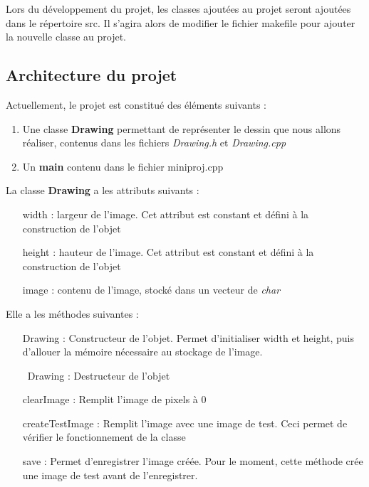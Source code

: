 \documentclass[
	12pt, %
]{fphw}
\begin{document}
Lors du développement du projet, les classes ajoutées au projet seront ajoutées dans le répertoire src. Il s'agira alors de modifier le fichier makefile pour ajouter la nouvelle classe au projet.

\subsection*{Architecture du projet}

Actuellement, le projet est constitué des éléments suivants :
\begin{enumerate}
	\item Une classe \textbf{Drawing} permettant de représenter le dessin que nous allons réaliser, contenus dans les fichiers \emph{Drawing.h} et \emph{Drawing.cpp}
	\item Un \textbf{main} contenu dans le fichier miniproj.cpp \\
\end{enumerate}

La classe \textbf{Drawing} a les attributs suivants :
\begin{itemize}
	\item [width :] largeur de l'image. Cet attribut est constant et défini à la construction de l'objet
	\item [height :] hauteur de l'image. Cet attribut est constant et défini à la construction de l'objet
	\item [image :] contenu de l'image, stocké dans un vecteur de \emph{char} \\
\end{itemize}

Elle a les méthodes suivantes :
\begin{itemize}
	\item [Drawing :] Constructeur de l'objet. Permet d'initialiser width et height, puis d'allouer la mémoire nécessaire au stockage de l'image.
	\item [~Drawing :] Destructeur de l'objet
	\item [clearImage :] Remplit l'image de pixels à 0
	\item [createTestImage :] Remplit l'image avec une image de test. Ceci permet de vérifier le fonctionnement de la classe
	\item [save :] Permet d'enregistrer l'image créée. Pour le moment, cette méthode crée une image de test avant de l'enregistrer. \\
\end{itemize}
\end{document}
